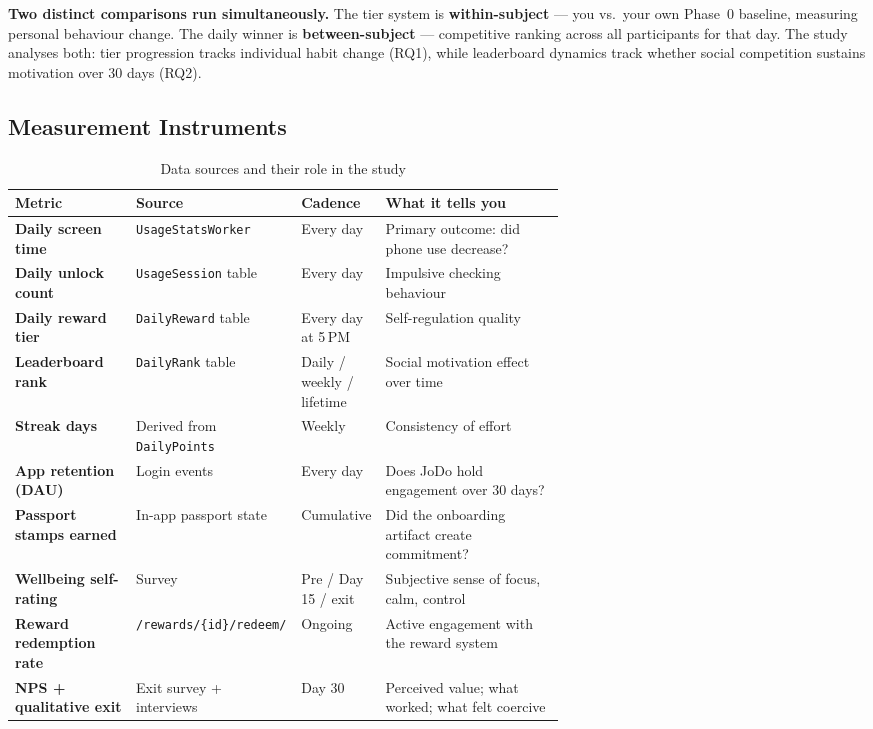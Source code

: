 \documentclass[12pt, a4paper]{article}
\begin{document}
\begin{notebox}
\small
\textbf{Two distinct comparisons run simultaneously.} The tier system is
\textbf{within-subject} --- you vs.\ your own Phase~0 baseline, measuring personal
behaviour change. The daily winner is \textbf{between-subject} --- competitive ranking
across all participants for that day. The study analyses both: tier progression tracks
individual habit change (RQ1), while leaderboard dynamics track whether social
competition sustains motivation over 30 days (RQ2).
\end{notebox}

\subsection{Measurement Instruments}

\renewcommand{\arraystretch}{1.5}
\begin{table}[H]
\centering
\caption{Data sources and their role in the study}
\begin{tabularx}{\linewidth}{>{\bfseries}p{0.22\linewidth} p{0.30\linewidth} p{0.12\linewidth} X}
\toprule
\rowcolor{tablehead}
\color{white}Metric & \color{white}Source & \color{white}Cadence & \color{white}What it tells you \\
\midrule
Daily screen time & \texttt{UsageStatsWorker} & Every day & Primary outcome: did phone use decrease? \\
\rowcolor{rowalt}
Daily unlock count & \texttt{UsageSession} table & Every day & Impulsive checking behaviour \\
Daily reward tier & \texttt{DailyReward} table & Every day at 5\,PM & Self-regulation quality \\
\rowcolor{rowalt}
Leaderboard rank & \texttt{DailyRank} table & Daily / weekly / lifetime & Social motivation effect over time \\
Streak days & Derived from \texttt{DailyPoints} & Weekly & Consistency of effort \\
\rowcolor{rowalt}
App retention (DAU) & Login events & Every day & Does JoDo hold engagement over 30 days? \\
Passport stamps earned & In-app passport state & Cumulative & Did the onboarding artifact create commitment? \\
\rowcolor{rowalt}
Wellbeing self-rating & Survey & Pre / Day 15 / exit & Subjective sense of focus, calm, control \\
Reward redemption rate & \texttt{/rewards/\{id\}/redeem/} & Ongoing & Active engagement with the reward system \\
\rowcolor{rowalt}
NPS + qualitative exit & Exit survey + interviews & Day 30 & Perceived value; what worked; what felt coercive \\
\bottomrule
\end{tabularx}
\end{table}
\end{document}
